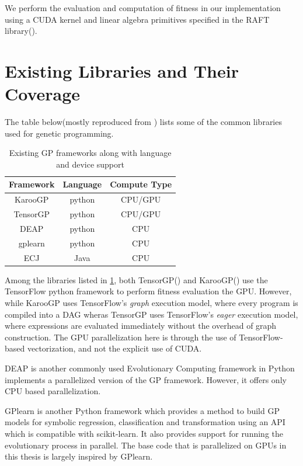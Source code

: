 We perform the evaluation and computation of fitness in our implementation using a CUDA kernel and linear algebra primitives specified in the RAFT library(\citep{raschka2020machine}).

\section{Existing Libraries and Their Coverage}
\label{sec:otherlibs}
The table below(mostly reproduced from \cite{baeta2021speed}) lists some of the common libraries  used for genetic programming.  

\begin{table}[htbp]
  \caption{Existing GP frameworks along with language and device support}
  \begin{center}
      \begin{tabular}[c]{|c|c|c|}
          \hline
          \textbf{Framework} &   \textbf{Language} & \textbf{Compute Type} \\
          \hline
          KarooGP & python & CPU/GPU \\
          TensorGP & python & CPU/GPU \\
          DEAP & python & CPU \\
          gplearn  & python & CPU \\
          ECJ & Java & CPU \\
          \hline
      \end{tabular}
      \label{tab:otherlibs}
  \end{center}
\end{table}

Among the libraries listed in \cref{tab:otherlibs}, both TensorGP(\citep{baeta2021tensorgp}) and KarooGP(\citep{staats2017tensorflow}) use the TensorFlow python framework to perform fitness evaluation the GPU. However, while KarooGP uses TensorFlow's \textit{graph} execution model, where every program is compiled into a DAG wheras TensorGP uses TensorFlow's \textit{eager} execution model\citep{agrawal2019tensorflow}, where expressions are evaluated immediately without the overhead of graph construction. The GPU parallelization here is through the use of TensorFlow-based vectorization, and not the explicit use of CUDA. 

DEAP \citep{DEAP_JMLR2012} is another commonly used Evolutionary Computing framework in Python implements a parallelized version of the GP framework. However, it offers only CPU based parallelization. 

GPlearn\citep{gplearn} is another Python framework which provides a method to build GP models for symbolic regression, classification and transformation using an API which is compatible with scikit-learn\citep{scikit-learn}. It also provides support for running the evolutionary process in parallel. The base code that is parallelized on GPUs in this thesis is largely inspired by GPlearn. 

